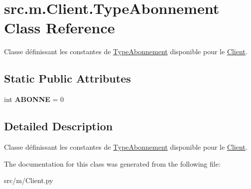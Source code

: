 \hypertarget{classsrc_1_1m_1_1_client_1_1_type_abonnement}{}\section{src.\+m.\+Client.\+Type\+Abonnement Class Reference}
\label{classsrc_1_1m_1_1_client_1_1_type_abonnement}


Classe définissant les constantes de \hyperlink{classsrc_1_1m_1_1_client_1_1_type_abonnement}{Type\+Abonnement} disponible pour le \hyperlink{classsrc_1_1m_1_1_client_1_1_client}{Client}.  


\subsection*{Static Public Attributes}
\begin{DoxyCompactItemize}
\item 
\hypertarget{classsrc_1_1m_1_1_client_1_1_type_abonnement_a83f1d7cb28ae4f99a73d30730b41adb1}{}int {\bfseries A\+B\+O\+N\+N\+E} = 0\label{classsrc_1_1m_1_1_client_1_1_type_abonnement_a83f1d7cb28ae4f99a73d30730b41adb1}

\end{DoxyCompactItemize}


\subsection{Detailed Description}
Classe définissant les constantes de \hyperlink{classsrc_1_1m_1_1_client_1_1_type_abonnement}{Type\+Abonnement} disponible pour le \hyperlink{classsrc_1_1m_1_1_client_1_1_client}{Client}. 

The documentation for this class was generated from the following file\+:\begin{DoxyCompactItemize}
\item 
src/m/Client.\+py\end{DoxyCompactItemize}
